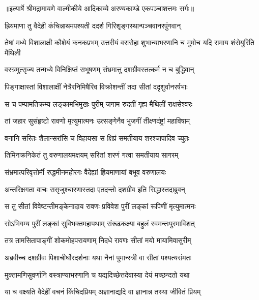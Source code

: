 {॥इत्यार्षे श्रीमद्रामायणे वाल्मीकीये आदिकाव्ये अरण्यकाण्डे एकपञ्चाशत्तमः सर्गः॥}


\twolineshloka
{ह्रियमाणा तु वैदेही कंचिन्नाथमपश्यती}
{ददर्श गिरिशृङ्गस्थान्पञ्चवानरपुंगवान्} %

\threelineshloka
{तेषां मध्ये विशालाक्षी कौशेयं कनकप्रभम्}
{उत्तरीयं वरारोहा शुभान्याभरणानि च}
{मुमोच यदि रामाय शंसेयुरिति मैथिली} %

\twolineshloka
{वस्त्रमुत्सृज्य तन्मध्ये विनिक्षिप्तं सभूषणम्}
{संभ्रमात्तु दशग्रीवस्तत्कर्म न च बुद्धिवान्} %

\twolineshloka
{पिङ्गाक्षास्तां विशालाक्षीं नेत्रैरनिमिषैरिव}
{विक्रोशन्तीं तदा सीतां ददृशुर्वानरर्षभाः} %

\twolineshloka
{स च पम्पामतिक्रम्य लङ्कामभिमुखः पुरीम्}
{जगाम रुदतीं गृह्य मैथिलीं राक्षसेश्वरः} %

\twolineshloka
{तां जहार सुसंहृष्टो रावणो मृत्युमात्मनः}
{उत्सङ्गेनैव भुजगीं तीक्ष्णदंष्ट्रां महाविषाम्} %

\twolineshloka
{वनानि सरितः शैलान्सरांसि च विहायसा}
{स क्षिप्रं समतीयाय शरश्चापादिव च्युतः} %

\twolineshloka
{तिमिनक्रनिकेतं तु वरुणालयमक्षयम्}
{सरितां शरणं गत्वा समतीयाय सागरम्} %

\twolineshloka
{संभ्रमात्परिवृत्तोर्मी रुद्धमीनमहोरगः}
{वैदेह्यां ह्रियमाणायां बभूव वरुणालयः} %

\twolineshloka
{अन्तरिक्षगता वाचः ससृजुश्चारणास्तदा}
{एतदन्तो दशग्रीव इति सिद्धास्तदाब्रुवन्} %

\twolineshloka
{स तु सीतां विवेष्टन्तीमङ्केनादाय रावणः}
{प्रविवेश पुरीं लङ्कां रूपिणीं मृत्युमात्मनः} %

\twolineshloka
{सोऽभिगम्य पुरीं लङ्कां सुविभक्तमहापथाम्}
{संरूढकक्ष्या बहुलं स्वमन्तःपुरमाविशत्} %

\twolineshloka
{तत्र तामसितापाङ्गीं शोकमोहपरायणाम्}
{निदधे रावणः सीतां मयो मायामिवासुरीम्} %

\twolineshloka
{अब्रवीच्च दशग्रीवः पिशाचीर्घोरदर्शनाः}
{यथा नैनां पुमान्स्त्री वा सीतां पश्यत्यसंमतः} %

\twolineshloka
{मुक्तामणिसुवर्णानि वस्त्राण्याभरणानि च}
{यद्यदिच्छेत्तदेवास्या देयं मच्छन्दतो यथा} %

\twolineshloka
{या च वक्ष्यति वैदेहीं वचनं किंचिदप्रियम्}
{अज्ञानाद्यदि वा ज्ञानान्न तस्या जीवितं प्रियम्} %

